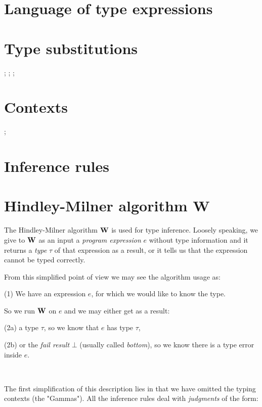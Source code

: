 \documentclass[a4paper,oneside]{memoir}
\begin{document}
\section{Language of type expressions}


\section{Type substitutions}

 ;  ;  ; 

\section{Contexts}

 ; 




\section{Inference rules}


\section{Hindley-Milner algorithm W}

The Hindley-Milner algorithm $\operatorname{\textbf{W}}$ is used for type inference.
Loosely speaking, we give to $\operatorname{\textbf{W}}$ as an input 
a \textit{program expression} $e$ without type information 
and it returns a \textit{type} $\tau$ of that expression as a result, 
or it tells us that the expression cannot be typed correctly.

From this simplified point of view we may see the algorithm usage as:

(1) We have an expression $e$, for which we would like to know the type. 

So we run $\operatorname{\textbf{W}}$ on $e$ and we may either get as a result:

(2a) a type $\tau$, so we know that $e$ has type $\tau$,

(2b) or the \textit{fail result} $\bot$ (usually called \textit{bottom}), so we know there is a type error inside $e$.

~   

The first simplification of this description lies in that we have omitted 
the typing contexts (the "Gammas"). 
All the inference rules deal with \textit{judgments} of the form:
\end{document}
